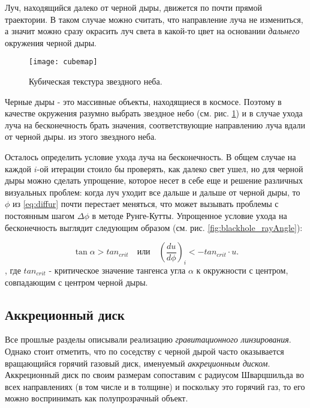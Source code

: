 Луч, находящийся далеко от черной дыры, движется по почти прямой траектории. В таком случае можно считать, что направление луча не измениться, а значит можно сразу окрасить луч света в какой-то цвет на основании \textit{дальнего} окружения черной дыры.

\newpage

\begin{figure}[h]
    \centering
    \texttt{[image: cubemap]}
    \caption{Кубическая текстура звездного неба.}
    \label{fig:cubemap}
\end{figure}

Черные дыры - это массивные объекты, находящиеся в космосе. Поэтому в качестве окружения разумно выбрать звездное небо (см. рис. \ref{fig:cubemap}) и в случае ухода луча на бесконечность брать значения, соответствующие направлению луча вдали от черной дыры. из этого звездного неба.

Осталось определить условие ухода луча на бесконечность. В общем случае на каждой $i$-ой итерации стоило бы проверять, как далеко свет ушел, но для черной дыры можно сделать упрощение, которое несет в себе еще и решение различных визуальных проблем: когда луч уходит все дальше и дальше от черной дыры, то $\phi$ из \eqref{eq:diffur} почти перестает меняться, что может вызывать проблемы с постоянным шагом $\Delta\phi$ в методе Рунге-Кутты. Упрощенное условие ухода на бесконечность выглядит следующим образом (см. рис. \ref{fig:blackhole_rayAngle}):

\begin{equation}
\label{eq:goes_to_infinity}
    \tan{\alpha} > tan_{crit} \quad \textit{или} \quad \left(\frac{du}{d\phi}\right)_i < -tan_{crit} \cdot u.
\end{equation}
, где $tan_{crit}$ - критическое значение тангенса угла $\alpha$ к окружности с центром, совпадающим с центром черной дыры.

\subsection{Аккреционный диск}
\label{subsec:accr_disk}

Все прошлые разделы описывали реализацию \textit{гравитационного линзирования}. Однако стоит отметить, что по соседству с черной дырой часто оказывается вращающийся горячий газовый диск, именуемый \textit{аккреционным диском}. Аккреционный диск по своим размерам сопоставим с радиусом Шварцшильда во всех направлениях (в том числе и в толщине) и поскольку это горячий газ, то его можно воспринимать как полупрозрачный объект.

